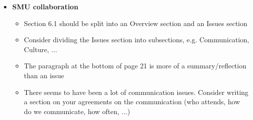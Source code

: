 \documentclass[]{article}
\begin{document}
\begin{itemize}
\item \textbf{SMU collaboration}
	\begin{itemize}
	\item Section 6.1 should be split into an Overview section and an Issues section
	\item Consider dividing the Issues section into subsections, e.g. Communication, Culture, ...
	\item The paragraph at the bottom of page 21 is more of a summary/reflection than an issue
	\item There seems to have been a lot of communication issues. Consider writing a section on your agreements on the communication (who attends, how do we communicate, how often, ...)
	\end{itemize}
\end{itemize}
\end{document}
